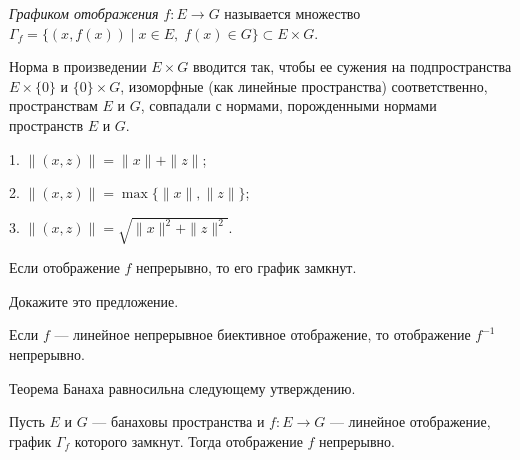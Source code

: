 \documentclass[10pt]{article}
\begin{document}
\begin{df}
\emph{Графиком отображения $f\colon E\to G$} называется множество
$\Gamma_f=\{(x,f(x))\mid x\in E,\;f(x)\in G\}\subset E\times G$.
\end{df}

Норма в произведении $E\times G$ вводится так, чтобы ее сужения на
подпространства $E\times\{0\}$ и $\{0\}\times G$, изоморфные (как
линейные пространства) соответственно, пространствам $E$ и $G$,
совпадали с нормами, порожденными нормами пространств $E$ и $G$.

\begin{ex}
  1. $\|(x,z)\|=\|x\|+\|z\|$;

  2. $\|(x,z)\|=\max\{\|x\|,\|z\|\}$;

  3. $\|(x,z)\|=\sqrt{\|x\|^2+\|z\|^2}$.
\end{ex}
\begin{prop}
Если отображение $f$ непрерывно, то его график замкнут.
\end{prop}

\begin{problem}
Докажите это предложение.
\end{problem}



\begin{theorem}[Банах]\label{th.obr.otobr.}
Если $f$ --- линейное непрерывное биективное ото\-бражение, то
отображение $f^{-1}$ непрерывно.
\end{theorem}

Теорема Банаха равносильна следующему утверждению.

\begin{theorem}\label{th.graf}
Пусть $E$ и $G$ --- банаховы пространства и $f\colon E\to G$
--- линейное отображение, график $\Gamma_f$
которого замкнут. Тогда отображение $f$ непрерывно.
\end{theorem}
\end{document}

